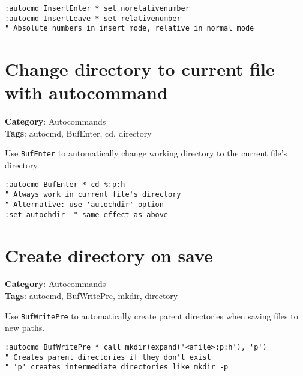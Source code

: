 \begin{Exa*}{}
\begin{Verbatim}[fontsize=\footnotesize, breaklines, breakanywhere]
:autocmd InsertEnter * set norelativenumber
:autocmd InsertLeave * set relativenumber
" Absolute numbers in insert mode, relative in normal mode
\end{Verbatim}
\end{Exa*}

\section{Change directory to current file with autocommand}

\textbf{Category}: Autocommands\\ \textbf{Tags}: autocmd, BufEnter, cd, directory
\vspace{0.5cm}

Use {\footnotesize \Verb§BufEnter§} to automatically change working directory to the current file's directory.

\begin{Exa*}{}
\begin{Verbatim}[fontsize=\footnotesize, breaklines, breakanywhere]
:autocmd BufEnter * cd %:p:h
" Always work in current file's directory
" Alternative: use 'autochdir' option
:set autochdir  " same effect as above
\end{Verbatim}
\end{Exa*}

\section{Create directory on save}

\textbf{Category}: Autocommands\\ \textbf{Tags}: autocmd, BufWritePre, mkdir, directory
\vspace{0.5cm}

Use {\footnotesize \Verb§BufWritePre§} to automatically create parent directories when saving files to new paths.

\begin{Exa*}{}
\begin{Verbatim}[fontsize=\footnotesize, breaklines, breakanywhere]
:autocmd BufWritePre * call mkdir(expand('<afile>:p:h'), 'p')
" Creates parent directories if they don't exist
" 'p' creates intermediate directories like mkdir -p
\end{Verbatim}
\end{Exa*}

